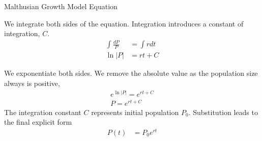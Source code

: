 \begin{frame}{Malthusian Growth Model Equation}

We integrate both sides of the equation. Integration introduces a constant of integration, $C$.
   \begin{align*}
    \int \frac{dP}{P} &= \int r dt \\
    \ln|P| &= rt + C
  \end{align*}

 We exponentiate both sides. We remove the absolute value as the population size always is positive, 
\begin{align*}
e^{\ln|P|} = e^{rt + C}  \\
P = e^{rt + C}  
\end{align*}
The  integration constant $C$ represents initial population $P_0$. Substitution leads to the final explicit form
\begin{align*}
    P(t) &= P_0 e^{rt} 
  \end{align*}
\end{frame}


